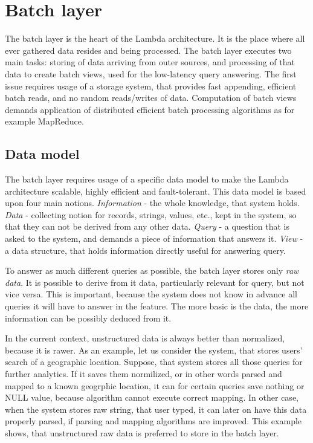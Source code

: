 \section{Batch layer}

The batch layer is the heart of the Lambda architecture.
It is the place where all ever gathered data resides and being processed.
The batch layer executes two main tasks: storing of data arriving from outer sources, and processing of that data to create batch views, used for the low-latency query answering.
The first issue requires usage of a storage system, that provides fast appending, efficient batch reads, and no random reads/writes of data.
Computation of batch views demands application of distributed efficient batch processing algorithms as for example MapReduce.

\subsection{Data model}

The batch layer requires usage of a specific data model to make the Lambda architecture scalable, highly efficient and fault-tolerant.
This data model is based upon four main notions.
\textit{Information} - the whole knowledge, that system holds.
\textit{Data} - collecting notion for records, strings, values, etc., kept in the system, so that they can not be derived from any other data.
\textit{Query} - a question that is asked to the system, and demands a piece of information that answers it.
\textit{View} - a data structure, that holds information directly useful for answering query.

To answer as much different queries as possible, the batch layer stores only \textit{raw data}.
It is possible to derive from it data, particularly relevant for query, but not vice versa.
This is important, because the system does not know in advance all queries it will have to answer in the feature.
The more basic is the data, the more information can be possibly deduced from it.

In the current context, unstructured data is always better than normalized, because it is rawer.
As an example, let us consider the system, that stores users' search of a geographic location.
Suppose, that system stores all those queries for further analytics.
If it saves them normilized, or in other words parsed and mapped to a known geogrphic location, it can for certain queries save nothing or NULL value, because algorithm cannot execute correct mapping.
In other case, when the system stores raw string, that user typed, it can later on have this data properly parsed, if parsing and mapping algorithms are improved.
This example shows, that unstructured raw data is preferred to store in the batch layer.

